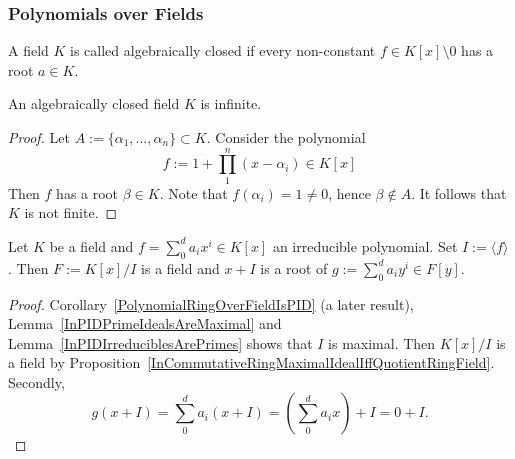 \subsubsection{Polynomials over Fields}
\begin{definition}
    A field $K$ is called algebraically closed if every non-constant $f\in K[x]\setminus 0$ has a root $a\in K$. 
\end{definition}
\begin{lemma}
    An algebraically closed field $K$ is infinite. 
\end{lemma}
\begin{proof}
    Let $A:=\{\alpha_1,\dots,\alpha_n\}\subset K$. Consider the polynomial
    $$
        f:= 1+\prod_1^n (x-\alpha_i)\in K[x]  
    $$
    Then $f$ has a root $\beta \in K$. Note that $f(\alpha_i) = 1 \neq 0$, hence $\beta \notin A$. It follows that $K$ is not finite. 
\end{proof}
\begin{lemma}\label{OverFieldQoutientRingWithRespectToIrreduciblePolynomialIsAField}
    Let $K$ be a field and $f=\sum_0^d a_ix^i\in K[x]$ an irreducible polynomial. Set $I:=\langle f\rangle$. Then $F:=K[x]/I$ is a field and $x+I$ is a root of $g:= \sum_0^d a_iy^i\in F[y]$.
\end{lemma}
\begin{proof}
    Corollary~\ref{PolynomialRingOverFieldIsPID} (a later result), Lemma~\ref{InPIDPrimeIdealsAreMaximal} and Lemma~\ref{InPIDIrreduciblesArePrimes} shows that $I$ is maximal. Then $K[x]/I$ is a field by Proposition~\ref{InCommutativeRingMaximalIdealIffQuotientRingField}. Secondly, 
    $$g(x+I)=\sum_0^d a_i(x+I)=\left(\sum_0^d a_ix\right)+I=0+I.$$
\end{proof}
